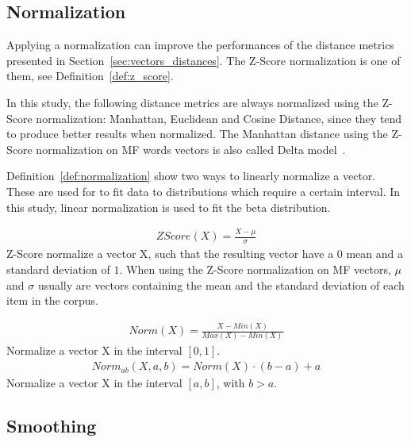 \subsection{Normalization \label{sec:normalization}}

Applying a normalization can improve the performances of the distance metrics presented in Section~\ref{sec:vectors_distances}.
The Z-Score normalization is one of them, see Definition~\ref{def:z_score}.

In this study, the following distance metrics are always normalized using the Z-Score normalization: Manhattan, Euclidean and Cosine Distance, since they tend to produce better results when normalized.
The Manhattan distance using the Z-Score normalization on MF words vectors is also called Delta model~\cite{savoy_stylo}.

Definition~\ref{def:normalization} show two ways to linearly normalize a vector.
These are used for to fit data to distributions which require a certain interval.
In this study, linear normalization is used to fit the beta distribution.

\begin{definition}
  \label{def:z_score}
  \begin{gather*}
    ZScore(X) = \frac{X - \mu}{\sigma}
  \end{gather*}
  Z-Score normalize a vector X, such that the resulting vector have a $0$ mean and a standard deviation of $1$.
  When using the Z-Score normalization on MF vectors, $\mu$ and $\sigma$ usually are vectors containing the mean and the standard deviation of each item in the corpus.
\end{definition}

\begin{definition}
  \label{def:normalization}
  \begin{gather*}
    Norm(X) = \frac{X - Min(X)}{Max(X) - Min(X)}
  \end{gather*}
  Normalize a vector X in the interval $[0, 1]$.
  \begin{gather*}
    Norm_{ab}(X, a, b) = Norm(X) \cdot (b - a) + a
  \end{gather*}
  Normalize a vector X in the interval $[a, b]$, with $b > a$.
\end{definition}

\subsection{Smoothing}


